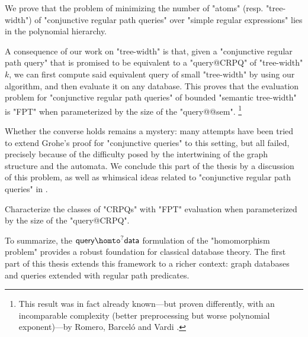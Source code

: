 \begin{contribution}
	We prove that the problem of minimizing the number of "atoms" (resp. "tree-width")
	of "conjunctive regular path queries" over "simple regular expressions"
	lies in the polynomial hierarchy.
\end{contribution}

A consequence of our work on "tree-width" is that,
given a "conjunctive regular path query" that is promised to be equivalent
to a "query@CRPQ" of "tree-width" $k$, we can first compute said
equivalent query of small "tree-width" by using our algorithm,
and then evaluate it on any database. This proves that the evaluation
problem for "conjunctive regular path queries" of bounded "semantic tree-width"
is "FPT" when parameterized by the size of the "query@@sem".%
\footnote{This result was in fact already known---but proven differently, with
an incomparable complexity (better preprocessing but worse polynomial exponent)---by
Romero, Barceló and Vardi \cite{RomeroBarceloVardi2017Homomorphism}.}

Whether the converse holds remains a mystery: many attempts
have been tried to extend Grohe's proof for "conjunctive queries" to this setting,
but all failed, precisely because of the difficulty posed
by the intertwining of the graph structure and the automata.
We conclude this part of the thesis by a discussion of this problem,
as well as whimsical ideas related to "conjunctive regular path queries"
in .

\begin{openproblemintro}
	Characterize the classes of "CRPQs" with "FPT" evaluation
	when parameterized by the size of the "query@CRPQ".
\end{openproblemintro}

To summarize, the $\textsf{query} \homto^? \textsf{data}$ formulation of the "homomorphism problem" provides a robust foundation for classical database theory. The first part of this thesis extends this framework to a richer context: graph databases and queries extended with regular path predicates.